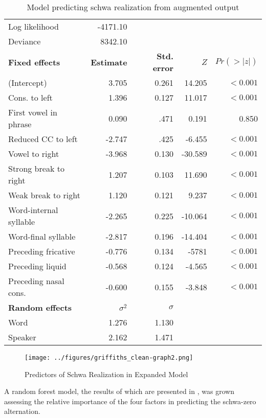 \documentclass[output=paper,colorlinks,citecolor=brown,
]{langscibook}
\begin{document}
\begin{table}
\caption{Model predicting schwa realization from augmented output}
\label{tab:griffiths:results2}
\begin{tabular}{lrrrr}
\midrule
Log likelihood & -4171.10 &  &  &  \\
Deviance & 8342.10 &  &  &  \\ \midrule
\textbf{Fixed effects} & \textbf{Estimate} & \textbf{Std. error} & $Z$ & $Pr(>|z|)$ \\ \midrule
(Intercept) & 3.705 & 0.261 & 14.205 & $<0.001$ \\
Cons. to left & 1.396 & 0.127 & 11.017 & $<0.001$ \\
First vowel in phrase & 0.090 & .471 & 0.191 & 0.850 \\
Reduced CC to left & -2.747 & .425 & -6.455 & $<0.001$ \\
Vowel to right & -3.968 & 0.130 & -30.589 & $<0.001$ \\
Strong break to right & 1.207 & 0.103 & 11.690 & $<0.001$ \\
Weak break to right & 1.120 & 0.121 & 9.237 & $<0.001$ \\
Word-internal syllable & -2.265 & 0.225 & -10.064 & $<0.001$ \\
Word-final syllable & -2.817 & 0.196 & -14.404 & $<0.001$ \\
Preceding fricative & -0.776 & 0.134 & -5781 & $<0.001$ \\
Preceding liquid & -0.568 & 0.124 & -4.565 & $<0.001$ \\
Preceding nasal cons. & -0.600 & 0.155 & -3.848 & $<0.001$ \\ \midrule
\textbf{Random effects} & $\sigma^2$ & $\sigma$ &  &  \\ \midrule
Word & 1.276 & 1.130 &  &  \\
Speaker & 2.162 & 1.471 &  &  \\ \midrule
\end{tabular}
\end{table}

\begin{figure}

\texttt{[image: ../figures/griffiths\_clean-graph2.png]}
\caption{Predictors of Schwa Realization in Expanded Model}
\label{fig:griffiths:clean.graph2}
\end{figure}

A random forest model, the results of which are presented in , was grown assessing the relative importance of the four factors in predicting the schwa-zero alternation.
\end{document}
